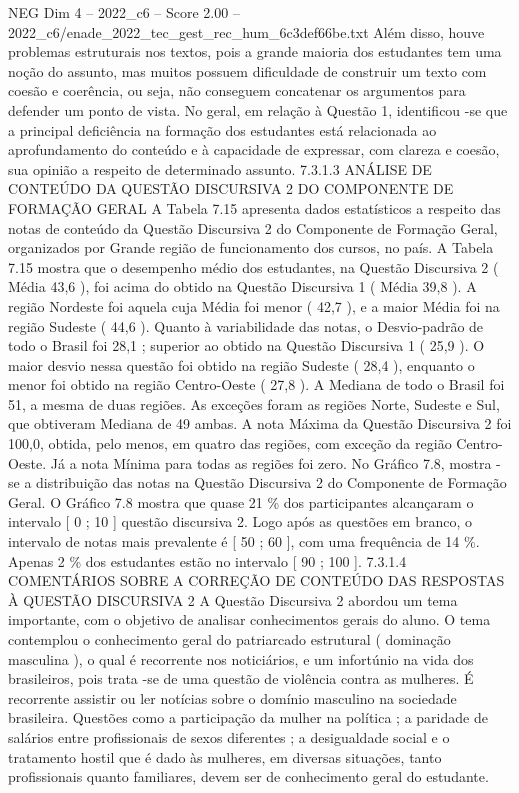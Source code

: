 \begin{textsample}{NEG Dim 4 – 2022\_c6 – Score 2.00 – 2022\_c6/enade\_2022\_tec\_gest\_rec\_hum\_6c3def66be.txt}
Além disso, houve problemas estruturais nos textos, pois a grande maioria dos estudantes tem uma noção do assunto, mas muitos possuem dificuldade de construir um texto com coesão e coerência, ou seja, não conseguem concatenar os argumentos para defender um ponto de vista.
No geral, em relação à Questão 1, identificou -se que a principal deficiência na formação dos estudantes está relacionada ao aprofundamento do conteúdo e à capacidade de expressar, com clareza e coesão, sua opinião a respeito de determinado assunto. 7.3.1.3 ANÁLISE DE CONTEÚDO DA QUESTÃO DISCURSIVA 2 DO COMPONENTE DE FORMAÇÃO GERAL A Tabela 7.15 apresenta dados estatísticos a respeito das notas de conteúdo da Questão Discursiva 2 do Componente de Formação Geral, organizados por Grande região de funcionamento dos cursos, no país.
A Tabela 7.15 mostra que o desempenho médio dos estudantes, na Questão Discursiva 2 ( Média 43,6 ), foi acima do obtido na Questão Discursiva 1 ( Média 39,8 ).
A região Nordeste foi aquela cuja Média foi menor ( 42,7 ), e a maior Média foi na região Sudeste ( 44,6 ).
Quanto à variabilidade das notas, o Desvio-padrão de todo o Brasil foi 28,1 ; superior ao obtido na Questão Discursiva 1 ( 25,9 ).
O maior desvio nessa questão foi obtido na região Sudeste ( 28,4 ), enquanto o menor foi obtido na região Centro-Oeste ( 27,8 ).
A Mediana de todo o Brasil foi 51, a mesma de duas regiões.
As exceções foram as regiões Norte, Sudeste e Sul, que obtiveram Mediana de 49 ambas.
A nota Máxima da Questão Discursiva 2 foi 100,0, obtida, pelo menos, em quatro das regiões, com exceção da região Centro-Oeste.
Já a nota Mínima para todas as regiões foi zero.
No Gráfico 7.8, mostra -se a distribuição das notas na Questão Discursiva 2 do Componente de Formação Geral.
O Gráfico 7.8 mostra que quase 21 \% dos participantes alcançaram o intervalo [ 0 ; 10 ] questão discursiva 2.
Logo após as questões em branco, o intervalo de notas mais prevalente é [ 50 ; 60 ], com uma frequência de 14 \%.
Apenas 2 \% dos estudantes estão no intervalo [ 90 ; 100 ]. 7.3.1.4 COMENTÁRIOS SOBRE A CORREÇÃO DE CONTEÚDO DAS RESPOSTAS À QUESTÃO DISCURSIVA 2 A Questão Discursiva 2 abordou um tema importante, com o objetivo de analisar conhecimentos gerais do aluno.
O tema contemplou o conhecimento geral do patriarcado estrutural ( dominação masculina ), o qual é recorrente nos noticiários, e um infortúnio na vida dos brasileiros, pois trata -se de uma questão de violência contra as mulheres.
É recorrente assistir ou ler notícias sobre o domínio masculino na sociedade brasileira.
Questões como a participação da mulher na política ; a paridade de salários entre profissionais de sexos diferentes ; a desigualdade social e o tratamento hostil que é dado às mulheres, em diversas situações, tanto profissionais quanto familiares, devem ser de conhecimento geral do estudante.

\end{textsample}
